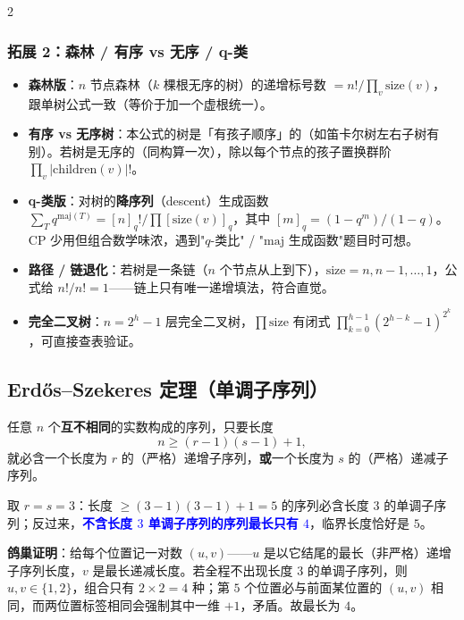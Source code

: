 \begin{multicols*}{2}
		\subsubsection*{拓展 2：森林 / 有序 vs 无序 / q-类}

		\begin{itemize}
			\item \textbf{森林版}：$n$ 节点森林（$k$ 棵根无序的树）的递增标号数 $= n! / \prod_v \mathrm{size}(v)$，跟单树公式一致（等价于加一个虚根统一）。
			\item \textbf{有序 vs 无序树}：本公式的树是「有孩子顺序」的（如笛卡尔树左右子树有别）。若树是无序的（同构算一次），除以每个节点的孩子置换群阶 $\prod_v |\mathrm{children}(v)|!$。
			\item \textbf{q-类版}：对树的\textbf{降序列}（descent）生成函数 $\sum_T q^{\mathrm{maj}(T)} = [n]_q! / \prod [\mathrm{size}(v)]_q$，其中 $[m]_q = (1 - q^m)/(1 - q)$。CP 少用但组合数学味浓，遇到"$q$-类比" / "$\mathrm{maj}$ 生成函数"题目时可想。
			\item \textbf{路径 / 链退化}：若树是一条链（$n$ 个节点从上到下），$\mathrm{size} = n, n-1, \dots, 1$，公式给 $n!/n! = 1$——链上只有唯一递增填法，符合直觉。
			\item \textbf{完全二叉树}：$n = 2^h - 1$ 层完全二叉树，$\prod \mathrm{size}$ 有闭式 $\prod_{k=0}^{h-1} (2^{h-k} - 1)^{2^k}$，可直接查表验证。
		\end{itemize}

		\subsection{Erd\H{o}s--Szekeres 定理（单调子序列）}

		任意 $n$ 个\textbf{互不相同}的实数构成的序列，只要长度
		\[
			n \ge (r - 1)(s - 1) + 1,
		\]
		就必含一个长度为 $r$ 的（严格）递增子序列，\textbf{或}一个长度为 $s$ 的（严格）递减子序列。

		取 $r = s = 3$：长度 $\ge (3 - 1)(3 - 1) + 1 = 5$ 的序列必含长度 $3$ 的单调子序列；反过来，\textcolor{blue}{\textbf{不含长度 $3$ 单调子序列的序列最长只有 $4$}}，临界长度恰好是 $5$。

		\textbf{鸽巢证明}：给每个位置记一对数 $(u, v)$——$u$ 是以它结尾的最长（非严格）递增子序列长度，$v$ 是最长递减长度。若全程不出现长度 $3$ 的单调子序列，则 $u, v \in \{1, 2\}$，组合只有 $2 \times 2 = 4$ 种；第 $5$ 个位置必与前面某位置的 $(u, v)$ 相同，而两位置标签相同会强制其中一维 $+1$，矛盾。故最长为 $4$。


\end{multicols*}
